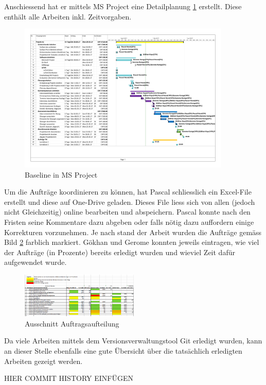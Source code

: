 Anschiessend hat er mittels MS Project eine Detailplanung \ref{fig:msproject} erstellt. Diese enthält alle Arbeiten inkl. Zeitvorgaben.

\begin{figure}[ht]
	\centering
	\includegraphics[width=0.9\textwidth]{images/BaselineAC2.pdf}
	\caption{Baseline in MS Project}
	\label{fig:msproject}
\end{figure}

Um die Aufträge koordinieren zu können, hat Pascal schliesslich ein Excel-File erstellt und diese auf One-Drive geladen. Dieses File liess sich von allen (jedoch nicht Gleichzeitig) online bearbeiten und abspeichern. Pascal konnte nach den Fristen seine Kommentare dazu abgeben oder falls nötig dazu auffordern einige Korrekturen vorzunehmen. Je nach stand der Arbeit wurden die Aufträge gemäss Bild \ref{fig:auftrage} farblich markiert. Gökhan und Gerome konnten jeweils eintragen, wie viel der Aufträge (in Prozente) bereits erledigt wurden und wieviel Zeit dafür aufgewendet wurde. 

\begin{figure}[ht]
	\centering
	\includegraphics[width=0.5\textwidth]{images/Auftrage}
	\caption{Ausschnitt Auftragsaufteilung}
	\label{fig:auftrage}
\end{figure}

Da viele Arbeiten mittels dem Versionsverwaltungstool Git erledigt wurden, kann an dieser Stelle ebenfalls eine gute Übersicht über die tatsächlich erledigten Arbeiten gezeigt werden.

HIER COMMIT HISTORY EINFÜGEN

